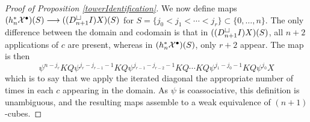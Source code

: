 \documentclass[11pt]{amsart}
\theoremstyle{plain}
\newcommand{\dupdown}[2]{D_{\smash{#1}}}
\begin{document}
\begin{proof}[Proof of Proposition \ref{towerIdentification}]
We now define maps $(h_n^*\mathcal{X}^\bullet)(S)\longrightarrow (({D}_{n+1}^{\smash{\square}}I)X)(S)$ for $S=\{j_0<j_1<\cdots<j_r\}\subset\{0,\ldots,n\}$. 
The only difference between the domain and codomain is that in $(({D}_{n+1}^{\smash{\square}}I)X)(S)$, all $n+2$ applications of $c$ are present, whereas in $(h_n^*\mathcal{X}^\bullet)(S)$, only $r+2$ appear. The map is then
\[\psi^{n-j_r}KQ\psi^{j_r-j_{r-1}-1}KQ\psi^{j_{r-1}-j_{r-2}-1}KQ\cdots KQ\psi^{j_{1}-j_0-1}KQ\psi^{j_0}X\]
which is to say that we apply the iterated diagonal the appropriate number of times in each $c$ appearing in the domain. As $\psi$ is coassociative, this definition is unambiguous, and the resulting maps assemble to a weak equivalence of $(n+1)$-cubes. 
\end{proof}
\end{document}
